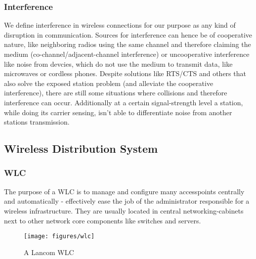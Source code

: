       \subsubsection{Interference}
	We define interference in wireless connections for our purpose as any kind of disruption in communication. Sources for interference can hence be
	of cooperative nature, like neighboring radios using the same channel and therefore claiming the medium (co-channel/adjacent-channel interference)
	or uncooperative interference like noise from devcies, which do not use the medium to transmit data, like microwaves or cordless phones.
	Despite solutions like RTS/CTS and others that also solve the exposed station problem (and alleviate the cooperative interference),
	there are still some situations where collisions and therefore interference can occur.
	Additionally at a certain signal-strength level a station, while doing its carrier sensing, isn't able to differentiate noise from another stations transmission.
	      
    \subsection{Wireless Distribution System}
      \subsubsection{\ac{WLC}}
	The purpose of a \ac{WLC} is to manage and configure many accesspoints centrally and automatically - effectively ease the job of the administrator responsible for a 
	wireless infrastructure. They are usually located in central networking-cabinets next to other network core components like switches and servers.
	\begin{figure}[h!]
	  \centering
	  \texttt{[image: figures/wlc]}
	  \caption{A Lancom \ac{WLC}}
	  \label{fig:wlc}
	\end{figure}
      
